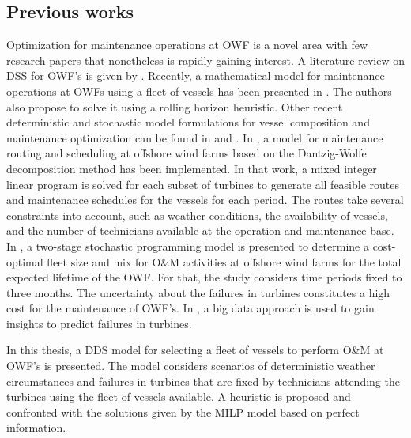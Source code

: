 \subsection{Previous works}
\label{subsec:worksOWF}
Optimization for maintenance operations at OWF is a novel area with few research papers that nonetheless is rapidly gaining interest. A literature review on DSS for OWF's is given by \cite{hofmannrev}. Recently, a mathematical model for maintenance operations at OWFs using a fleet of vessels has been presented in \cite{Raknes2017}. The authors also propose to solve it using a rolling horizon heuristic. Other recent deterministic and stochastic model formulations for vessel composition and maintenance optimization  can be found in \cite{Gundegjerde2015} and \cite{HALVORSENWEARE2013}.
%
In \cite{EJOR2016}, a model for maintenance routing
and scheduling at offshore wind farms based on the Dantzig-Wolfe decomposition method has been implemented.
In that work, a mixed integer linear program is solved for each subset of turbines to generate all  feasible routes and maintenance schedules for the vessels for each period.
The routes take several constraints into account, such as weather conditions, the availability of vessels,
and the number of technicians available at the operation and maintenance base.
%
In \cite{Stalhane2016357}, a two-stage stochastic programming model is presented to determine a cost-optimal fleet size and mix for
O\&M activities at offshore wind farms for the total expected lifetime of the OWF. For that, the study considers time periods fixed to three months. The uncertainty about the failures in turbines constitutes a high cost for the maintenance of OWF's. In \cite{Helsen2016}, a big data approach is used to gain insights to predict failures in turbines.

In this thesis, a DDS model for selecting a fleet of vessels to perform O\&M at OWF's is presented. The model considers scenarios of deterministic weather circumstances and failures in turbines that are fixed by technicians attending the turbines using the fleet of vessels available. A heuristic is proposed and confronted with the solutions given by the MILP model based on perfect information.


